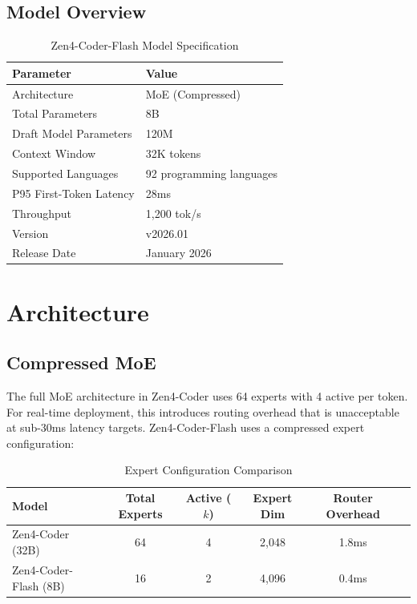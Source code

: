 \documentclass[11pt,a4paper]{article}
\begin{document}
\subsection{Model Overview}

\begin{table}[H]
\centering
\caption{Zen4-Coder-Flash Model Specification}
\begin{tabular}{ll}
\toprule
\textbf{Parameter} & \textbf{Value} \\
\midrule
Architecture & MoE (Compressed) \\
Total Parameters & 8B \\
Draft Model Parameters & 120M \\
Context Window & 32K tokens \\
Supported Languages & 92 programming languages \\
P95 First-Token Latency & 28ms \\
Throughput & 1,200 tok/s \\
Version & v2026.01 \\
Release Date & January 2026 \\
\bottomrule
\end{tabular}
\end{table}

\section{Architecture}

\subsection{Compressed MoE}

The full MoE architecture in Zen4-Coder uses 64 experts with 4 active per token. For real-time deployment, this introduces routing overhead that is unacceptable at sub-30ms latency targets. Zen4-Coder-Flash uses a compressed expert configuration:

\begin{table}[H]
\centering
\caption{Expert Configuration Comparison}
\begin{tabular}{lccccc}
\toprule
\textbf{Model} & \textbf{Total Experts} & \textbf{Active ($k$)} & \textbf{Expert Dim} & \textbf{Router Overhead} \\
\midrule
Zen4-Coder (32B) & 64 & 4 & 2,048 & 1.8ms \\
Zen4-Coder-Flash (8B) & 16 & 2 & 4,096 & 0.4ms \\
\bottomrule
\end{tabular}
\end{table}
\end{document}
